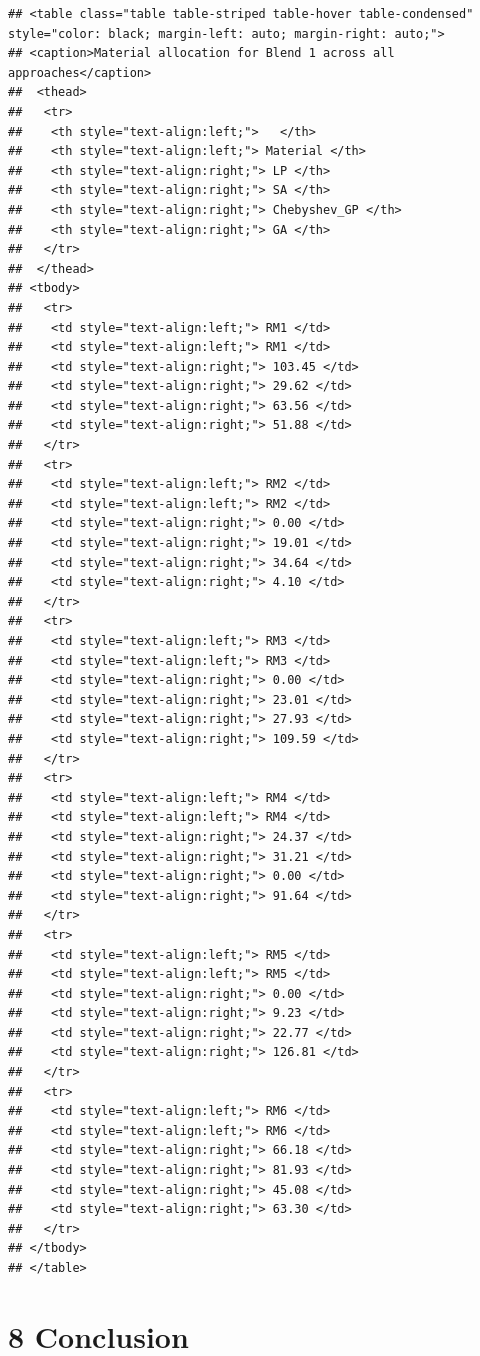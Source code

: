 \documentclass[
]{article}
\begin{document}
\begin{verbatim}
## <table class="table table-striped table-hover table-condensed" style="color: black; margin-left: auto; margin-right: auto;">
## <caption>Material allocation for Blend 1 across all approaches</caption>
##  <thead>
##   <tr>
##    <th style="text-align:left;">   </th>
##    <th style="text-align:left;"> Material </th>
##    <th style="text-align:right;"> LP </th>
##    <th style="text-align:right;"> SA </th>
##    <th style="text-align:right;"> Chebyshev_GP </th>
##    <th style="text-align:right;"> GA </th>
##   </tr>
##  </thead>
## <tbody>
##   <tr>
##    <td style="text-align:left;"> RM1 </td>
##    <td style="text-align:left;"> RM1 </td>
##    <td style="text-align:right;"> 103.45 </td>
##    <td style="text-align:right;"> 29.62 </td>
##    <td style="text-align:right;"> 63.56 </td>
##    <td style="text-align:right;"> 51.88 </td>
##   </tr>
##   <tr>
##    <td style="text-align:left;"> RM2 </td>
##    <td style="text-align:left;"> RM2 </td>
##    <td style="text-align:right;"> 0.00 </td>
##    <td style="text-align:right;"> 19.01 </td>
##    <td style="text-align:right;"> 34.64 </td>
##    <td style="text-align:right;"> 4.10 </td>
##   </tr>
##   <tr>
##    <td style="text-align:left;"> RM3 </td>
##    <td style="text-align:left;"> RM3 </td>
##    <td style="text-align:right;"> 0.00 </td>
##    <td style="text-align:right;"> 23.01 </td>
##    <td style="text-align:right;"> 27.93 </td>
##    <td style="text-align:right;"> 109.59 </td>
##   </tr>
##   <tr>
##    <td style="text-align:left;"> RM4 </td>
##    <td style="text-align:left;"> RM4 </td>
##    <td style="text-align:right;"> 24.37 </td>
##    <td style="text-align:right;"> 31.21 </td>
##    <td style="text-align:right;"> 0.00 </td>
##    <td style="text-align:right;"> 91.64 </td>
##   </tr>
##   <tr>
##    <td style="text-align:left;"> RM5 </td>
##    <td style="text-align:left;"> RM5 </td>
##    <td style="text-align:right;"> 0.00 </td>
##    <td style="text-align:right;"> 9.23 </td>
##    <td style="text-align:right;"> 22.77 </td>
##    <td style="text-align:right;"> 126.81 </td>
##   </tr>
##   <tr>
##    <td style="text-align:left;"> RM6 </td>
##    <td style="text-align:left;"> RM6 </td>
##    <td style="text-align:right;"> 66.18 </td>
##    <td style="text-align:right;"> 81.93 </td>
##    <td style="text-align:right;"> 45.08 </td>
##    <td style="text-align:right;"> 63.30 </td>
##   </tr>
## </tbody>
## </table>
\end{verbatim}

\section{8 Conclusion}\label{conclusion}
\end{document}

